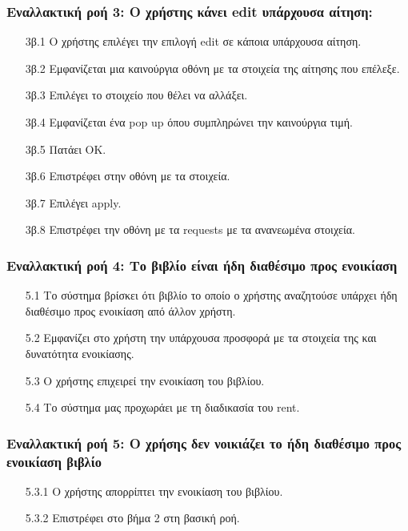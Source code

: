\documentclass[12pt,a4paper]{article}
\begin{document}
\subsubsection*{Εναλλακτική ροή 3: Ο χρήστης κάνει edit υπάρχουσα αίτηση:}
\begin{enumerate}
    \item [3β.1] Ο χρήστης επιλέγει την επιλογή edit σε κάποια υπάρχουσα αίτηση.
    \item [3β.2] Εμφανίζεται μια καινούργια οθόνη με τα στοιχεία της αίτησης που επέλεξε.
    \item [3β.3] Επιλέγει το στοιχείο που θέλει να αλλάξει.
    \item [3β.4] Εμφανίζεται ένα pop up όπου συμπληρώνει την καινούργια τιμή.
    \item [3β.5] Πατάει OK.
    \item [3β.6] Επιστρέφει στην οθόνη με τα στοιχεία.
    \item [3β.7] Επιλέγει apply.
    \item [3β.8] Επιστρέφει την οθόνη με τα requests με τα ανανεωμένα στοιχεία.
\end{enumerate}

\subsubsection*{Εναλλακτική ροή 4: Το βιβλίο είναι ήδη διαθέσιμο προς ενοικίαση}
\begin{enumerate}
    \item[5.1] Το σύστημα βρίσκει ότι βιβλίο το οποίο ο χρήστης αναζητούσε υπάρχει ήδη διαθέσιμο προς ενοικίαση από άλλον χρήστη.
    \item[5.2] Εμφανίζει στο χρήστη την υπάρχουσα προσφορά με τα στοιχεία της και δυνατότητα ενοικίασης.
    \item[5.3] Ο χρήστης επιχειρεί την ενοικίαση του βιβλίου.
    \item[5.4] Το σύστημα μας προχωράει με τη διαδικασία του rent.
\end{enumerate}

\subsubsection*{Εναλλακτική ροή 5: Ο χρήσης δεν νοικιάζει το ήδη διαθέσιμο προς ενοικίαση βιβλίο}
\begin{enumerate}
    \item [5.3.1] Ο χρήστης απορρίπτει την ενοικίαση του βιβλίου.
    \item [5.3.2] Επιστρέφει στο βήμα 2 στη βασική ροή.
\end{enumerate}
\end{document}
